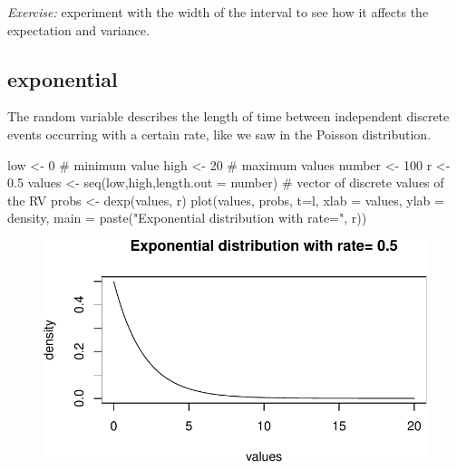 \documentclass[
  letterpaper,
  DIV=11,
  numbers=noendperiod]{scrreprt}
\newenvironment{Shaded}{\begin{snugshade}}{\end{snugshade}}
\newcommand{\AttributeTok}[1]{\textcolor[rgb]{0.40,0.45,0.13}{#1}}
\newcommand{\CommentTok}[1]{\textcolor[rgb]{0.37,0.37,0.37}{#1}}
\newcommand{\DecValTok}[1]{\textcolor[rgb]{0.68,0.00,0.00}{#1}}
\newcommand{\FloatTok}[1]{\textcolor[rgb]{0.68,0.00,0.00}{#1}}
\newcommand{\FunctionTok}[1]{\textcolor[rgb]{0.28,0.35,0.67}{#1}}
\newcommand{\NormalTok}[1]{\textcolor[rgb]{0.00,0.23,0.31}{#1}}
\newcommand{\OtherTok}[1]{\textcolor[rgb]{0.00,0.23,0.31}{#1}}
\newcommand{\StringTok}[1]{\textcolor[rgb]{0.13,0.47,0.30}{#1}}
\begin{document}
\emph{Exercise:} experiment with the width of the interval to see how it
affects the expectation and variance.

\hypertarget{exponential}{%
\subsection{exponential}\label{exponential}}

The random variable describes the length of time between independent
discrete events occurring with a certain rate, like we saw in the
Poisson distribution.

\begin{Shaded}
\begin{Highlighting}[]
\NormalTok{low }\OtherTok{\textless{}{-}} \DecValTok{0} \CommentTok{\# minimum value}
\NormalTok{high }\OtherTok{\textless{}{-}} \DecValTok{20} \CommentTok{\# maximum values}
\NormalTok{number }\OtherTok{\textless{}{-}} \DecValTok{100}
\NormalTok{r }\OtherTok{\textless{}{-}} \FloatTok{0.5}
\NormalTok{values }\OtherTok{\textless{}{-}} \FunctionTok{seq}\NormalTok{(low,high,}\AttributeTok{length.out =}\NormalTok{ number) }\CommentTok{\# vector of discrete values of the RV}
\NormalTok{probs }\OtherTok{\textless{}{-}} \FunctionTok{dexp}\NormalTok{(values, r)}
\FunctionTok{plot}\NormalTok{(values, probs, }\AttributeTok{t=}\StringTok{\textquotesingle{}l\textquotesingle{}}\NormalTok{, }\AttributeTok{xlab =} \StringTok{\textquotesingle{}values\textquotesingle{}}\NormalTok{, }\AttributeTok{ylab =} \StringTok{\textquotesingle{}density\textquotesingle{}}\NormalTok{,}
        \AttributeTok{main =} \FunctionTok{paste}\NormalTok{(}\StringTok{"Exponential distribution with rate="}\NormalTok{, r))}
\end{Highlighting}
\end{Shaded}

\begin{figure}[H]

{\centering \includegraphics{./04-distributions_files/figure-pdf/unnamed-chunk-11-1.pdf}

}

\end{figure}
\end{document}
